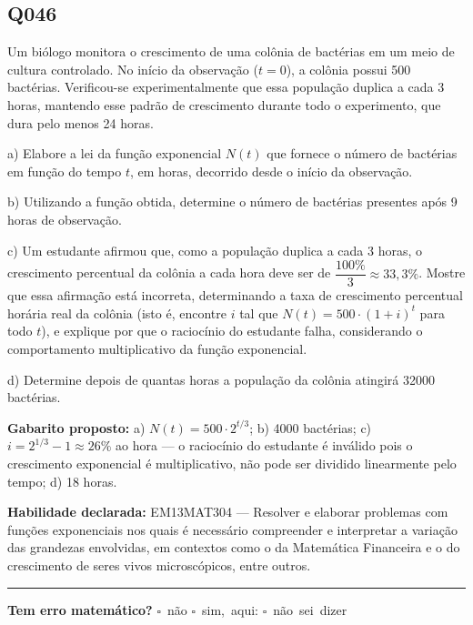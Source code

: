 \documentclass[11pt,a4paper]{article}
\begin{document}
\underline{\hspace{\linewidth}}
\vspace{0.6em}

\begin{samepage}
\subsection*{Q046}
Um biólogo monitora o crescimento de uma colônia de bactérias em um meio de cultura controlado. No início da observação ($t=0$), a colônia possui 500 bactérias. Verificou-se experimentalmente que essa população duplica a cada 3 horas, mantendo esse padrão de crescimento durante todo o experimento, que dura pelo menos 24 horas.

a) Elabore a lei da função exponencial $N(t)$ que fornece o número de bactérias em função do tempo $t$, em horas, decorrido desde o início da observação.

b) Utilizando a função obtida, determine o número de bactérias presentes após 9 horas de observação.

c) Um estudante afirmou que, como a população duplica a cada 3 horas, o crescimento percentual da colônia a cada hora deve ser de $\dfrac{100\%}{3}\approx 33{,}3\%$. Mostre que essa afirmação está incorreta, determinando a taxa de crescimento percentual horária real da colônia (isto é, encontre $i$ tal que $N(t) = 500\cdot(1+i)^t$ para todo $t$), e explique por que o raciocínio do estudante falha, considerando o comportamento multiplicativo da função exponencial.

d) Determine depois de quantas horas a população da colônia atingirá 32000 bactérias.

\textbf{Gabarito proposto:} a) $N(t) = 500\cdot 2^{t/3}$; b) 4000 bactérias; c) $i = 2^{1/3}-1 \approx 26\%$ ao hora — o raciocínio do estudante é inválido pois o crescimento exponencial é multiplicativo, não pode ser dividido linearmente pelo tempo; d) 18 horas.

\textbf{Habilidade declarada:} EM13MAT304 --- Resolver e elaborar problemas com funções exponenciais nos quais é necessário compreender e interpretar a variação das grandezas envolvidas, em contextos como o da Matemática Financeira e o do crescimento de seres vivos microscópicos, entre outros.
\end{samepage}

\noindent\rule{\linewidth}{0.4pt}
\textbf{Tem erro matemático?}\quad
\mbox{$\square$~não} \quad \mbox{$\square$~sim, aqui:} \underline{\hspace{5cm}}
\quad \mbox{$\square$~não sei dizer}
\end{document}
